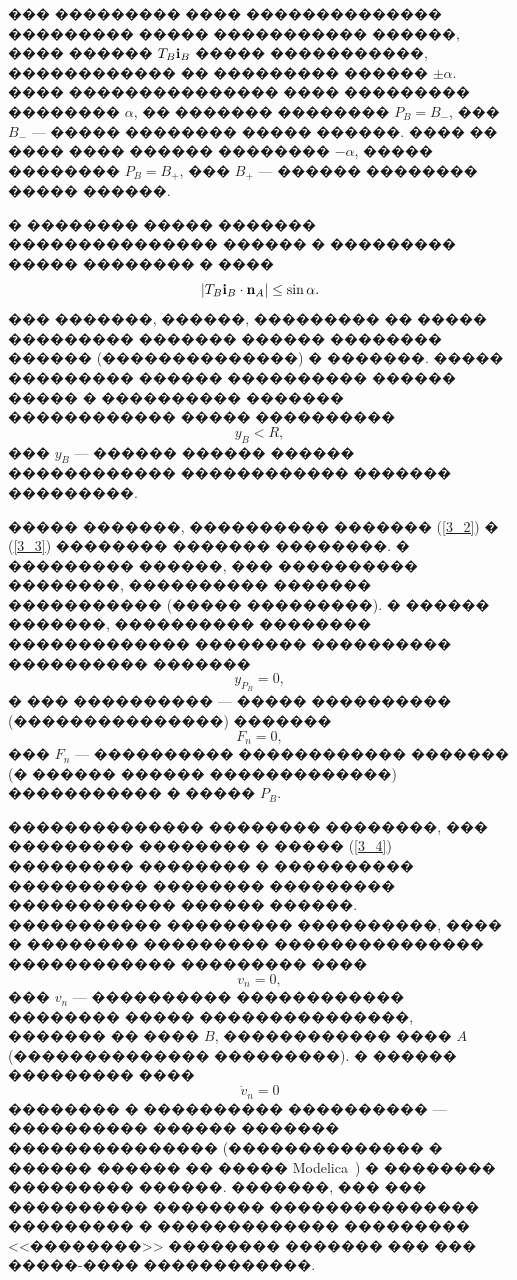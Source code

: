\documentclass[12pt,a4paper]{article}
\begin{document}
��� ��������� ���� �������������� ��������� ����� ����������� ������, ���� 
������ $T_B{\bf i}_B$ ����� �����������, ������������ �� ��������� ������
$\pm\alpha $. ���� ��������������� ���� ��������� �������� $\alpha $, �� 
������� �������� $P_B=B_{-}$, ��� $B_{-}$ --- ����� �������� ����� ������. ����
�� ���� ���� ������ �������� $-\alpha $, ����� �������� $P_B=B_{+}$, ��� 
$B_{+}$ --- ������ �������� ����� ������.

� �������� ����� ������� ��������������� ������ � ��������� ����� �������� � 
����
\begin{equation}
\left| T_B{\bf i}_B\cdot {\bf n}_A\right|\le\sin\alpha .
\label{3_2}
\end{equation}
��� �������, ������, ��������� �� ����� ��������� ������� ������ �������� 
������ (��������������) � �������. ����� ��������� ������ ���������� ������
����� � ���������� ������� ������������ ����� ���������� 
\begin{equation}
y_B<R,
\label{3_3}
\end{equation}
��� $y_B$ --- ������ ������ ������ ������������ ������������ ������� ���������.

����� �������, ���������� ������� (\ref{3_2}) � (\ref{3_3}) �������� �������
��������. � ��������� ������, ��� ���������� ��������, ���������� ������� 
����������� (����� ���������). � ������ �������, ���������� �������� 
������������� �������� ���������� ���������� ������� 
\begin{equation}
y_{P_B}=0,
\label{3_4}
\end{equation}
� ��� ���������� --- ����� ���������� (���������������) �������
$$
F_n=0,
$$
��� $F_n$ --- ���������� ������������ ������� (� ������ ������ �������������) 
����������� � ����� $P_B$.

�������������� �������� ��������, ��� ��������� �������� � ����� (\ref{3_4})
��������� �������� � ���������� ���������� �������� ��������� ������������ 
������ ������. ����������� ��������� ����������, ���� � �������� ��������� 
��������������� ������������ ��������� ���� 
$$
v_n=0,
$$
��� $v_n$ --- ���������� ������������ �������� ����� ���������������, �������
�� ���� $B$, ������������ ���� $A$ (�������������� ���������). � ������ 
��������� ����
$$
\dot{v}_n=0
$$
�������� � ���������� ���������� --- ���������� ������ ������� ���������������
(�������������� � ������ ������ �� ����� Modelica~\cite{Fritzson}) � �������� 
��������� ������. �������, ��� ��� ���������� �������� ��������������� 
��������� � ������������� ��������� <<��������>> �������� ������� ��� ��� 
�����-���� ������������.
\end{document}
